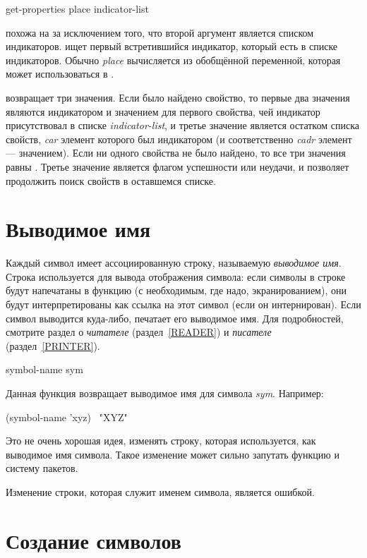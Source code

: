 \begin{defun}[Функция]
get-properties place indicator-list

 похожа на  за исключением того, что второй
аргумент является списком индикаторов.  ищет первый
встретившийся индикатор, который есть в списке индикаторов. Обычно \emph{place}
вычисляется из обобщённой переменной, которая может использоваться в .

 возвращает три значения.
Если было найдено свойство, то первые два значения являются индикатором и
значением для первого свойства, чей индикатор присутствовал в списке
\emph{indicator-list}, и третье значение является остатком списка свойств,
\emph{car} элемент которого был индикатором (и соответственно \emph{cadr}
элемент --- значением).
Если ни одного свойства не было найдено, то все три значения равны {\nil}.
Третье значение является флагом успешности или неудачи, и позволяет продолжить
поиск свойств в оставшемся списке.
\end{defun}

\section{Выводимое имя}

Каждый символ имеет ассоциированную строку, называемую \emph{выводимое имя}.
Строка используется для вывода отображения символа:
если символы в строке будут напечатаны в функцию  (с необходимым, где
надо, экранированием), они будут интерпретированы как ссылка на этот символ
(если он интернирован). Если символ выводится куда-либо,  печатает
его выводимое имя.
Для подробностей, смотрите раздел о \emph{читателе} (раздел~\ref{READER}) и
\emph{писателе} (раздел~\ref{PRINTER}).

\begin{defun}[Функция]
symbol-name sym

Данная функция возвращает выводимое имя для символа \emph{sym}.
Например:
\begin{lisp}
(symbol-name 'xyz) \EV\ "XYZ"
\end{lisp}
Это не очень хорошая идея, изменять строку, которая используется, как выводимое
имя символа. Такое изменение может сильно запутать функцию  и систему
пакетов.

Изменение строки, которая служит именем символа, является ошибкой.
\end{defun}

\section{Создание символов}

